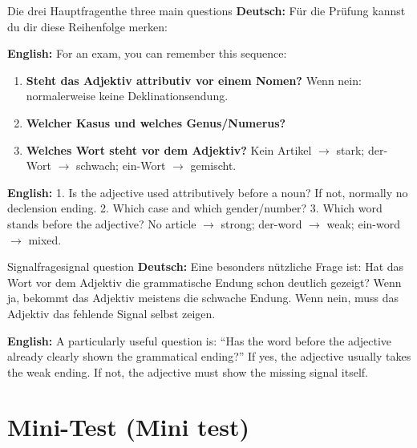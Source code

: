 \documentclass[a4paper,11pt]{article}
\newcommand{\GermanText}[1]{\textbf{Deutsch: }#1\par}
\newcommand{\EnglishText}[1]{{\small\color{SoftGray}\textbf{English: }#1\par}}
\begin{document}
\begin{grammarentry}{Die drei Hauptfragen}{the three main questions}
\GermanText{Für die Prüfung kannst du dir diese Reihenfolge merken:}
\EnglishText{For an exam, you can remember this sequence:}

\begin{enumerate}
\item \textbf{Steht das Adjektiv attributiv vor einem Nomen?} Wenn nein: normalerweise keine Deklinationsendung.
\item \textbf{Welcher Kasus und welches Genus/Numerus?}
\item \textbf{Welches Wort steht vor dem Adjektiv?} Kein Artikel $\rightarrow$ stark; der-Wort $\rightarrow$ schwach; ein-Wort $\rightarrow$ gemischt.
\end{enumerate}

\EnglishText{1. Is the adjective used attributively before a noun? If not, normally no declension ending. 2. Which case and which gender/number? 3. Which word stands before the adjective? No article $\rightarrow$ strong; der-word $\rightarrow$ weak; ein-word $\rightarrow$ mixed.}
\end{grammarentry}

\begin{grammarentry}{Signalfrage}{signal question}
\GermanText{Eine besonders nützliche Frage ist: \glqq Hat das Wort vor dem Adjektiv die grammatische Endung schon deutlich gezeigt?\grqq{} Wenn ja, bekommt das Adjektiv meistens die schwache Endung. Wenn nein, muss das Adjektiv das fehlende Signal selbst zeigen.}
\EnglishText{A particularly useful question is: ``Has the word before the adjective already clearly shown the grammatical ending?'' If yes, the adjective usually takes the weak ending. If not, the adjective must show the missing signal itself.}
\end{grammarentry}

\section{Mini-Test \textnormal{(Mini test)}}
\end{document}
